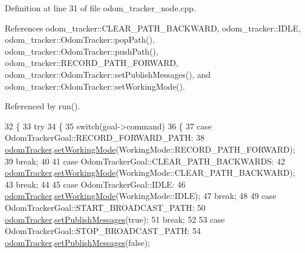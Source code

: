 Definition at line 31 of file odom\+\_\+tracker\+\_\+node.\+cpp.



References odom\+\_\+tracker\+::\+C\+L\+E\+A\+R\+\_\+\+P\+A\+T\+H\+\_\+\+B\+A\+C\+K\+W\+A\+RD, odom\+\_\+tracker\+::\+I\+D\+LE, odom\+\_\+tracker\+::\+Odom\+Tracker\+::pop\+Path(), odom\+\_\+tracker\+::\+Odom\+Tracker\+::push\+Path(), odom\+\_\+tracker\+::\+R\+E\+C\+O\+R\+D\+\_\+\+P\+A\+T\+H\+\_\+\+F\+O\+R\+W\+A\+RD, odom\+\_\+tracker\+::\+Odom\+Tracker\+::set\+Publish\+Messages(), and odom\+\_\+tracker\+::\+Odom\+Tracker\+::set\+Working\+Mode().



Referenced by run().


\begin{DoxyCode}
32 \{
33   \textcolor{keywordflow}{try}
34   \{
35     \textcolor{keywordflow}{switch}(goal->command)
36     \{
37       \textcolor{keywordflow}{case} OdomTrackerGoal::RECORD\_FORWARD\_PATH: 
38         \hyperlink{classOdomTrackerActionServer_a3e5c4328d3206fbd2fd2708f0aefe651}{odomTracker}.\hyperlink{classodom__tracker_1_1OdomTracker_ac001a40d1107ef0d88aa7db03cafb08c}{setWorkingMode}(WorkingMode::RECORD\_PATH\_FORWARD);
39       \textcolor{keywordflow}{break};
40 
41       \textcolor{keywordflow}{case} OdomTrackerGoal::CLEAR\_PATH\_BACKWARDS:
42         \hyperlink{classOdomTrackerActionServer_a3e5c4328d3206fbd2fd2708f0aefe651}{odomTracker}.\hyperlink{classodom__tracker_1_1OdomTracker_ac001a40d1107ef0d88aa7db03cafb08c}{setWorkingMode}(WorkingMode::CLEAR\_PATH\_BACKWARD);
43       \textcolor{keywordflow}{break};
44 
45       \textcolor{keywordflow}{case} OdomTrackerGoal::IDLE:
46         \hyperlink{classOdomTrackerActionServer_a3e5c4328d3206fbd2fd2708f0aefe651}{odomTracker}.\hyperlink{classodom__tracker_1_1OdomTracker_ac001a40d1107ef0d88aa7db03cafb08c}{setWorkingMode}(WorkingMode::IDLE);
47       \textcolor{keywordflow}{break};
48 
49       \textcolor{keywordflow}{case} OdomTrackerGoal::START\_BROADCAST\_PATH:
50         \hyperlink{classOdomTrackerActionServer_a3e5c4328d3206fbd2fd2708f0aefe651}{odomTracker}.\hyperlink{classodom__tracker_1_1OdomTracker_abcfb8d68a75223ff1daba4930f4f7034}{setPublishMessages}(\textcolor{keyword}{true});
51       \textcolor{keywordflow}{break};
52 
53       \textcolor{keywordflow}{case} OdomTrackerGoal::STOP\_BROADCAST\_PATH:
54         \hyperlink{classOdomTrackerActionServer_a3e5c4328d3206fbd2fd2708f0aefe651}{odomTracker}.\hyperlink{classodom__tracker_1_1OdomTracker_abcfb8d68a75223ff1daba4930f4f7034}{setPublishMessages}(\textcolor{keyword}{false});

\end{DoxyCode}
